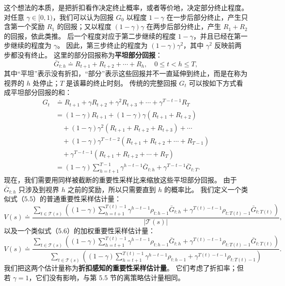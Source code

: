 \documentclass[UTF8, 12pt, fontset=fandol, oneside]{ctexart}
\begin{document}
这个想法的本质，是把折扣看作决定终止概率，或者等价地，决定部分终止程度。
对任意 $\gamma\in[0,1)$，我们可以认为回报 $G_0$ 以程度 $1-\gamma$ 在一步后部分终止，产生只含第一个奖励 $R_1$ 的回报；又以程度 $(1-\gamma)\gamma$ 在两步后部分终止，产生 $R_1+R_2$ 的回报，依此类推。
后一个程度对应于第二步继续的程度 $1-\gamma$，并且已经在第一步继续的程度为 $\gamma$。
因此，第三步终止的程度为 $(1-\gamma)\gamma^2$，其中 $\gamma^2$ 反映前两步都没有终止。
这里的部分回报称为\textbf{平坦部分回报}：
\[
\bar G_{t:h}\doteq R_{t+1}+R_{t+2}+\cdots+R_h,
\quad 0\le t<h\le T,
\]
其中“平坦”表示没有折扣，“部分”表示这些回报并不一直延伸到终止，而是在称为视界的 $h$ 处停止；$T$ 是该幕的终止时刻。
传统的完整回报 $G_t$ 可以按如下方式看成平坦部分回报的和：
\[
\begin{aligned}
G_t &\doteq R_{t+1}+\gamma R_{t+2}+\gamma^2R_{t+3}+\cdots+\gamma^{T-t-1}R_T\\
&= (1-\gamma)R_{t+1}
 +(1-\gamma)\gamma(R_{t+1}+R_{t+2})\\
&\quad +(1-\gamma)\gamma^2(R_{t+1}+R_{t+2}+R_{t+3})+\cdots\\
&\quad +(1-\gamma)\gamma^{T-t-2}(R_{t+1}+R_{t+2}+\cdots+R_{T-1})\\
&\quad +\gamma^{T-t-1}(R_{t+1}+R_{t+2}+\cdots+R_T)\\
&=(1-\gamma)\sum_{h=t+1}^{T-1}\gamma^{h-t-1}\bar G_{t:h}
 +\gamma^{T-t-1}\bar G_{t:T}.
\end{aligned}
\]
现在，我们需要用同样被截断的重要性采样比来缩放这些平坦部分回报。
由于 $\bar G_{t:h}$ 只涉及到视界 $h$ 之前的奖励，所以只需要直到 $h$ 的概率比。
我们定义一个类似式（5.5）的普通重要性采样估计量：
\begin{equation}
V(s)\doteq
\frac{
\sum_{t\in\mathcal{T}(s)}
\left((1-\gamma)\sum_{h=t+1}^{T(t)-1}\gamma^{h-t-1}\rho_{t:h-1}\bar G_{t:h}
+\gamma^{T(t)-t-1}\rho_{t:T(t)-1}\bar G_{t:T(t)}\right)}
{|\mathcal{T}(s)|},
\end{equation}
以及一个类似式（5.6）的加权重要性采样估计量：
\begin{equation}
V(s)\doteq
\frac{
\sum_{t\in\mathcal{T}(s)}
\left((1-\gamma)\sum_{h=t+1}^{T(t)-1}\gamma^{h-t-1}\rho_{t:h-1}\bar G_{t:h}
+\gamma^{T(t)-t-1}\rho_{t:T(t)-1}\bar G_{t:T(t)}\right)}
{\sum_{t\in\mathcal{T}(s)}
\left((1-\gamma)\sum_{h=t+1}^{T(t)-1}\gamma^{h-t-1}\rho_{t:h-1}
+\gamma^{T(t)-t-1}\rho_{t:T(t)-1}\right)}.
\end{equation}
我们把这两个估计量称为\textbf{折扣感知的重要性采样估计量}。
它们考虑了折扣率；但若 $\gamma=1$，它们没有影响，与第 5.5 节的离策略估计量相同。
\end{document}
